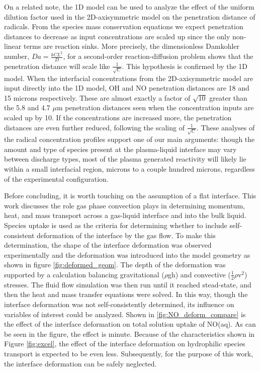 On a related note, the 1D model can be used to analyze the effect of the uniform dilution factor used in the 2D-axisymmetric model on the penetration distance of radicals. From the species mass conservation equations we expect penetration distances to decrease as input concentrations are scaled up since the only non-linear terms are reaction sinks. More precisely, the dimensionless Damkohler number, $Da=\frac{kCL^2}{D}$, for a second-order reaction-diffusion problem shows that the penetration distance will scale like $\frac{1}{\sqrt{C}}$. \cite[p. 55]{deen1998analysis} This hypothesis is confirmed by the 1D model. When the interfacial concentrations from the 2D-axisymmetric model are input directly into the 1D model, OH and NO penetration distances are 18 and 15 microns respectively. These are almost exactly a factor of $\sqrt{10}$ greater than the 5.8 and 4.7 $\mu$m penetration distances seen when the concentration inputs are scaled up by 10. If the concentrations are increased more, the penetration distances are even further reduced, following the scaling of $\frac{1}{\sqrt{C}}$. These analyses of the radical concentration profiles support one of our main arguments: though the amount and type of species present at the plasma-liquid interface may vary between discharge types, most of the plasma generated reactivity will likely lie within a small interfacial region, microns to a couple hundred microns, regardless of the experimental configuration.

Before concluding, it is worth touching on the assumption of a flat interface. This work discusses the role gas phase convection plays in determining momentum, heat, and mass transport across a gas-liquid interface and into the bulk liquid. Species uptake is used as the criteria for determining whether to include self-consistent deformation of the interface by the gas flow. To make this determination, the shape of the interface deformation was observed experimentally and the deformation was introduced into the model geometry as shown in figure \ref{fig:deformed_geom}. The depth of the deformation was supported by a calculation balancing gravitational ($\rho$gh) and convective ($\frac{1}{2}\rho$v$^2$) stresses. The fluid flow simulation was then run until it reached stead-state, and then the heat and mass transfer equations were solved. In this way, though the interface deformation was not self-consistently determined, its influence on variables of interest could be analyzed. Shown in \ref{fig:NO_deform_compare} is the effect of the interface deformation on total solution uptake of NO(aq). As can be seen in the figure, the effect is minute. Because of the characteristics shown in Figure \ref{fig:excel}, the effect of the interface deformation on hydrophilic species transport is expected to be even less. Subsequently, for the purpose of this work, the interface deformation can be safely neglected.

